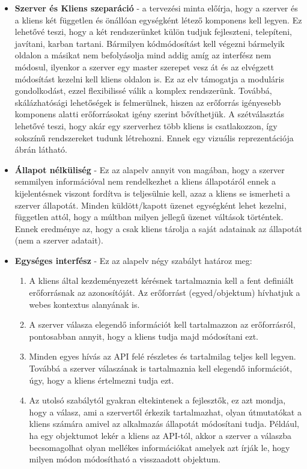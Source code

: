  \begin{itemize}
	\item \textbf{Szerver és Kliens szeparáció} - a tervezési minta előírja, hogy a szerver és a kliens két független és önállóan egységként létező komponens kell legyen. Ez lehetővé teszi, hogy a két rendszerünket külön tudjuk fejleszteni, telepíteni, javítani, karban tartani. Bármilyen kódmódosítást kell végezni bármelyik oldalon a másikat nem befolyásolja mind addig amíg az interfész nem módosul, ilyenkor a szerver egy master szerepet vesz át és az elvégzett módosítást kezelni kell kliens oldalon is. Ez az elv támogatja a moduláris gondolkodást, ezzel flexibilissé válik a komplex rendszerünk. Továbbá, skálázhatósági lehetőségek is felmerülnek, hiszen az erőforrás igényesebb komponens alatti erőforrásokat igény szerint bővíthetjük. A szétválasztás lehetővé teszi, hogy akár egy szerverhez több kliens is csatlakozzon, így sokszínű rendszereket tudunk létrehozni. Ennek egy vizuális reprezentációja  ábrán látható.
	\item \textbf{Állapot nélküliség} - Ez az alapelv annyit von magában, hogy a szerver semmilyen információval nem rendelkezhet a kliens állapotáról ennek a kijelentésnek viszont fordítva is teljesülnie kell, azaz a kliens se ismerheti a szerver állapotát. Minden küldött/kapott üzenet egységként lehet kezelni, független attól, hogy a múltban milyen jellegű üzenet váltások történtek. Ennek eredménye az, hogy a csak kliens tárolja a saját adatainak az állapotát (nem a szerver adatait).
	\item \textbf{Egységes interfész} - Ez az alapelv négy szabályt határoz meg:
	\begin{enumerate}
		\item A kliens által kezdeményezett kérésnek tartalmaznia kell a fent definiált erőforrásnak az azonosítóját. Az erőforrást (egyed/objektum) hívhatjuk a webes kontextus alanyának is.
		\item A szerver válasza elegendő információt kell tartalmazzon az erőforrásról, pontosabban annyit, hogy a kliens tudja majd módosítani ezt.
		\item Minden egyes hívás az API felé részletes és tartalmilag teljes kell legyen. Továbbá a szerver válaszának is tartalmaznia kell elegendő információt, úgy, hogy a kliens értelmezni tudja ezt.
		\item Az utolsó szabálytól gyakran eltekintenek a fejlesztők, ez azt mondja, hogy a válasz, ami a szervertől érkezik tartalmazhat, olyan útmutatókat a kliens számára amivel az alkalmazás állapotát módosítani tudja. Például, ha egy objektumot lekér a kliens az API-tól, akkor a szerver a válaszba becsomagolhat olyan mellékes információkat amelyek azt írják le, hogy milyen módon módosítható a visszaadott objektum.

\end{enumerate}
\end{itemize}
